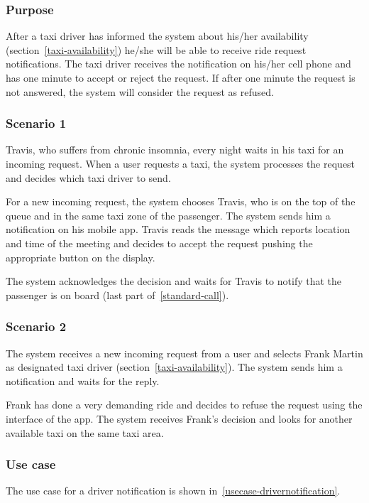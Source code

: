 \label{driver-notification}
\subsubsection{Purpose}

After a taxi driver has informed the system about his/her availability (section~\ref{taxi-availability})
he/she will be able to receive ride request notifications. The taxi driver receives the notification on his/her cell phone and has one minute to accept or reject the request. If after one minute the request is not answered, the system will consider the request as refused.

\subsubsection{Scenario 1}
Travis, who suffers from chronic insomnia, every night waits in his taxi for an incoming request. When a user requests a taxi, the system processes the request and decides which taxi driver to send.

For a new incoming request, the system chooses Travis, who is on the top of the queue and in the same taxi zone of the passenger. The system sends him a notification on his mobile app. Travis reads the message which reports location and time of the meeting and decides to accept the request pushing the appropriate button on the display.

The system acknowledges the decision and waits for Travis to notify that the passenger is on board (last part of~\ref{standard-call}).

\subsubsection{Scenario 2}
The system receives a new incoming request from a user and selects Frank Martin as designated taxi driver (section~\ref{taxi-availability}).
The system sends him a notification and waits for the reply.

Frank has done a very demanding ride and decides to refuse the request using the interface of the app. The system receives Frank's decision and looks for another available taxi on the same taxi area.

\subsubsection{Use case}
The use case for a driver notification is shown in~\autoref{usecase-drivernotification}.

